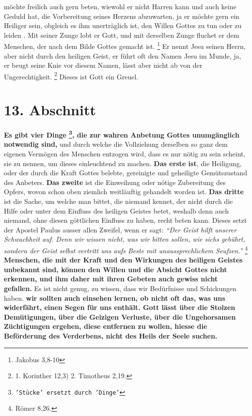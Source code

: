 möchte freilich auch
gern beten, wiewohl er nicht Harren kann und auch keine Geduld 
hat, die
Vorbereitung seines Herzens abzuwarten, ja er möchte gern ein Heiliger
 sein,
obgleich es ihm unerträglich ist, den Willen Gottes zu tun 
oder zu leiden . Mit
seiner Zunge lobt er Gott, und mit derselben Zunge fluchet er dem Menschen, der
nach dem Bilde Gottes gemacht ist.
\footnote{Jakobus 3,8-10}
 Er nennt Jesu
seinen Herrn, aber nicht durch den heiligen Geist, er führt oft den Namen
Jesu im Munde, ja, er beugt seine Knie vor diesem Namen, lässt aber nicht ab
von der Ungerechtigkeit. 
\footnote{1. Korinther 12,3) 2. Timotheus 2,19.}
Dieses ist Gott ein Greuel.

\section{13. Abschnitt} \label{kap6_ab13}

\label{ref:06_13_vier_noetige_dinge}
 \textbf{Es gibt vier Dinge
\footnote{\texttt{'Stücke' ersetzt durch 'Dinge'}}, die zur wahren Anbetung Gottes
unumgänglich
notwendig
sind,} und durch welche die Vollziehung derselben so ganz dem eigenen Vermögen
des Menschen entzogen wird, dass es nur nötig zu sein scheint, sie zu nennen,
um dieses einleuchtend zu machen. \textbf{Das erste ist}, die Heiligung, oder
der durch
die Kraft Gottes belebte, gereinigte und geheiligte Gemütszustand des Anbeters.
\textbf{Das zweite} ist die Einweihung oder nötige Zubereitung des Opfers,
wovon schon
oben ziemlich weitläuftig gehandelt worden ist. \textbf{Das dritte} ist die
Sache, um
welche man bittet, die niemand kennet, der nicht durch die Hilfe oder unter dem
Einfluss des heiligen Geistes  betet, weshalb
denn auch
niemand, ohne diesen
göttlichen Einfluss zu haben, recht beten kann. Dieses setzt der Apostel
Paulus ausser allen Zweifel, wenn er sagt:
\textit{"`Der Geist hilft unserer
Schwachheit auf. Denn wir wissen nicht, was wir bitten sollen, wie sichs
gebührt, sondern der Geist selbst vertritt uns aufs Beste mit
unaussprechlichem Seufzen."'}
\footnote{Römer 8,26.}
\textbf{Menschen, die mit der
Kraft
und den Wirkungen des heiligen Geistes unbekannt sind, können den Willen und die
Absicht Gottes nicht erkennen, und ihm daher mit ihren Gebeten auch gewiss
nicht gefallen.} Es ist nicht genug, zu wissen, dass wir Bedürfnisse und
Schickungen haben.  \textbf{wir sollten auch einsehen
lernen, ob nicht oft das,
was uns
widerfährt, einen Segen  für uns enthält. Gott lässt über die
Stolzen
Demütigungen, über die Geizigen Verluste, über die
Ungehorsamen Züchtigungen
ergehen, diese entfernen zu wollen, hiesse die Beförderung des Verderbens, nicht
des Heils der Seele suchen.}

